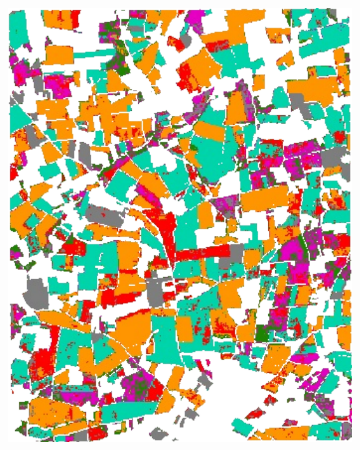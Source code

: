 \documentclass[journal,article,submit,pdftex,moreauthors]{Definitions/mdpi}
\providecommand{\DIFadd}[1]{{\protect\color{blue}\uwave{#1}}} %
\providecommand{\DIFaddFL}[1]{\DIFadd{#1}} %
\providecommand{\DIFaddbeginFL}{} %
\providecommand{\DIFaddendFL}{} %
\providecommand{\DIFdelbeginFL}{} %
\providecommand{\DIFdelendFL}{} %
\begin{document}
\begin{figure}[H]
{	%
	}%
\DIFdelendFL \DIFaddbeginFL \DIFaddFL{\hspace{-1.5mm}
	}\begin{subfigure}[t]{0.3\linewidth}
	  \includegraphics[height=\linewidth]{figures/aes_1_layer_mse_results/classification_maps/prediction_pixel_level.pdf}
	\caption{}
	\label{fig:classification_pixel_level}
	\end{subfigure}\DIFaddFL{\hspace{-6.5mm} 
	}\begin{subfigure}[t]{0.3\linewidth}
	\DIFaddendFL \centering
    \DIFdelbeginFL %

\end{subfigure}
\end{figure}
\end{document}
